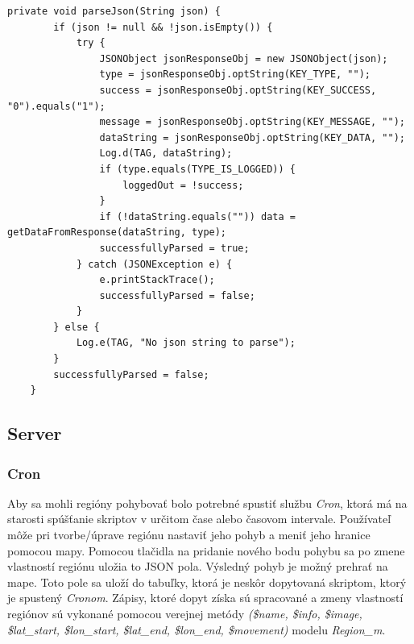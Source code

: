 \lstset{language=Java,
basicstyle=\tiny
}        
\begin{lstlisting}[frame=single]
 private void parseJson(String json) {
        if (json != null && !json.isEmpty()) {
            try {
                JSONObject jsonResponseObj = new JSONObject(json);
                type = jsonResponseObj.optString(KEY_TYPE, "");
                success = jsonResponseObj.optString(KEY_SUCCESS, "0").equals("1");
                message = jsonResponseObj.optString(KEY_MESSAGE, "");
                dataString = jsonResponseObj.optString(KEY_DATA, "");
                Log.d(TAG, dataString);
                if (type.equals(TYPE_IS_LOGGED)) {
                    loggedOut = !success;
                }
                if (!dataString.equals("")) data = getDataFromResponse(dataString, type);
                successfullyParsed = true;
            } catch (JSONException e) {
                e.printStackTrace();
                successfullyParsed = false;
            }
        } else {
            Log.e(TAG, "No json string to parse");
        }
        successfullyParsed = false;
    }
\end{lstlisting}

\subsection{Server}
\subsubsection{Cron}
Aby sa mohli regióny pohybovať bolo potrebné spustiť službu \emph{Cron}, ktorá má na starosti spúšťanie skriptov v určitom čase alebo časovom intervale. Používateľ môže pri tvorbe/úprave regiónu nastaviť jeho pohyb a meniť jeho hranice pomocou mapy. Pomocou tlačidla na pridanie nového bodu pohybu sa po zmene vlastností regiónu uložia to JSON pola. Výsledný pohyb je možný prehrať na mape. Toto pole sa uloží do tabuľky, ktorá je neskôr dopytovaná skriptom, ktorý je spustený \emph{Cronom}. Zápisy, ktoré dopyt získa sú spracované a zmeny vlastností regiónov sú vykonané pomocou verejnej metódy \emph{(\$name, \$info, \$image, \$lat_start, \$lon_start, \$lat_end, \$lon_end, \$movement)} modelu \emph{Region_m}.

\lstset{language=PHP,
basicstyle=\tiny}          %

\begin{lstlisting}[frame=single]  % Start your code-block

\end{lstlisting}

